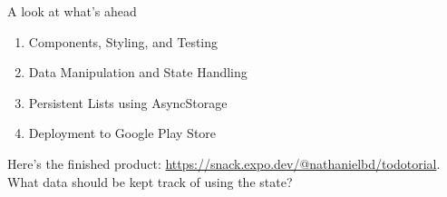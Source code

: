 \documentclass{beamer}
\begin{document}
\begin{frame}{A look at what's ahead}
	\begin{enumerate}
		\item Components, Styling, and Testing
		\item Data Manipulation and State Handling
		\item Persistent Lists using AsyncStorage
		\item Deployment to Google Play Store
	\end{enumerate}

	\bigskip\pause

	Here's the finished product: \href{https://snack.expo.dev/@nathanielbd/todotorial}{https://snack.expo.dev/@nathanielbd/todotorial}. \pause What data should be kept track of using the state?
\end{frame}
\end{document}
